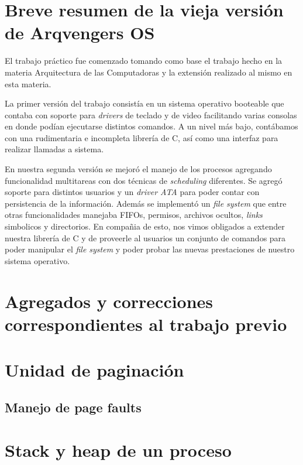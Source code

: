 \documentclass[a4paper,10pt]{article}
\begin{document}
\newpage
\section{Breve resumen de la vieja versión de Arqvengers OS}
El trabajo práctico fue comenzado tomando como base el trabajo hecho en la materia Arquitectura de las Computadoras y la extensión 
realizado al mismo en esta materia.

 La primer versión del trabajo consistía en un sistema operativo booteable que contaba con soporte para \textit{drivers} de
  teclado y de video facilitando varias consolas en donde podían ejecutarse distintos comandos. 
  A un nivel más bajo, contábamos con una rudimentaria e incompleta librería de C, así como una interfaz para realizar
  llamadas a sistema.

En nuestra segunda versión se mejoró el manejo de los procesos agregando funcionalidad multitareas con dos técnicas de 
\textit{scheduling} diferentes. Se agregó soporte para distintos usuarios y un \textit{driver ATA} para poder contar con persistencia 
de la información. Además se implementó un \textit{file system} que entre otras funcionalidades manejaba FIFOs, permisos, 
archivos ocultos, \textit{links} simbolicos y directorios. En compañia de esto, nos vimos obligados a extender nuestra librería de 
C y de proveerle al usuarios un conjunto de comandos para poder manipular el \textit{file system} y poder probar las nuevas 
prestaciones de nuestro sistema operativo.

\newpage

\section{Agregados y correcciones correspondientes al trabajo previo}

\newpage

\section{Unidad de paginación}

\subsection{Manejo de page faults}

\newpage

\section{Stack y heap de un proceso}
\end{document}
